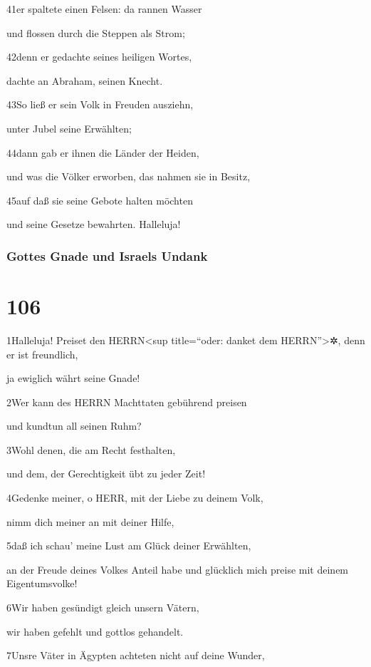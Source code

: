 41er spaltete einen Felsen: da rannen Wasser

und flossen durch die Steppen als Strom;

42denn er gedachte seines heiligen Wortes,

dachte an Abraham, seinen Knecht.

43So ließ er sein Volk in Freuden ausziehn,

unter Jubel seine Erwählten;

44dann gab er ihnen die Länder der Heiden,

und was die Völker erworben, das nahmen sie in Besitz,

45auf daß sie seine Gebote halten möchten

und seine Gesetze bewahrten. Halleluja!

\hypertarget{gottes-gnade-und-israels-undank}{%
\subsubsection{Gottes Gnade und Israels
Undank}\label{gottes-gnade-und-israels-undank}}

\hypertarget{section-105}{%
\section{106}\label{section-105}}

1Halleluja! Preiset den HERRN\textless sup title=``oder: danket dem
HERRN''\textgreater✲, denn er ist freundlich,

ja ewiglich währt seine Gnade!

2Wer kann des HERRN Machttaten gebührend preisen

und kundtun all seinen Ruhm?

3Wohl denen, die am Recht festhalten,

und dem, der Gerechtigkeit übt zu jeder Zeit!

4Gedenke meiner, o HERR, mit der Liebe zu deinem Volk,

nimm dich meiner an mit deiner Hilfe,

5daß ich schau' meine Lust am Glück deiner Erwählten,

an der Freude deines Volkes Anteil habe und glücklich mich preise mit
deinem Eigentumsvolke!

6Wir haben gesündigt gleich unsern Vätern,

wir haben gefehlt und gottlos gehandelt.

7Unsre Väter in Ägypten achteten nicht auf deine Wunder,

